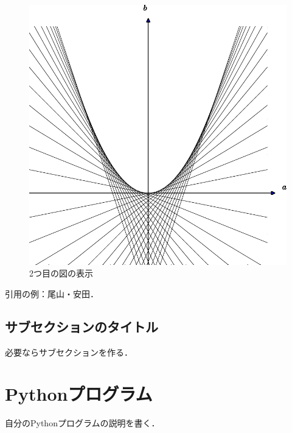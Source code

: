 \documentclass[11pt,a4j,fleqn]{jarticle}
\begin{document}
\begin{figure}
 \centering
 \includegraphics{envelope1.pdf}
 \caption{2つ目の図の表示}
 \label{fig:2}
\end{figure}



引用の例：尾山・安田\cite{OyamaYasuda11}．


\subsection{サブセクションのタイトル}

必要ならサブセクションを作る．



\section{Pythonプログラム}

自分のPythonプログラムの説明を書く．
\end{document}
